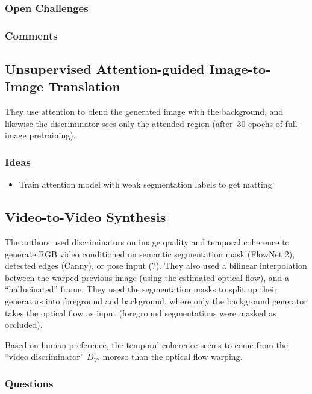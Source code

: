 \documentclass[a4paper, 12pt]{article}
\begin{document}
\subsubsection{Open Challenges}


\subsubsection{Comments}


\subsection{Unsupervised Attention-guided Image-to-Image
            Translation~\cite{mejjati2018unsupervised}}

They use attention to blend the generated image with the background, and
likewise the discriminator sees only the attended region (after~\num{30} epochs
of full-image pretraining).


\subsubsection{Ideas}

\begin{itemize}
        \item Train attention model with weak segmentation labels to get
                matting.
\end{itemize}


\subsection{Video-to-Video Synthesis~\cite{wang2018vid2vid}}

The authors used discriminators on image quality and temporal coherence to
generate RGB video conditioned on semantic segmentation mask (FlowNet 2),
detected edges (Canny), or pose input (?). They also used a bilinear
interpolation between the warped previous image (using the estimated optical
flow), and a ``hallucinated'' frame. They used the segmentation masks to split
up their generators into foreground and background, where only the background
generator takes the optical flow as input (foreground segmentations were masked
as occluded).

Based on human preference, the temporal coherence seems to come from the
``video discriminator'' $D_V$, moreso than the optical flow warping.


\subsubsection{Questions}
\end{document}

